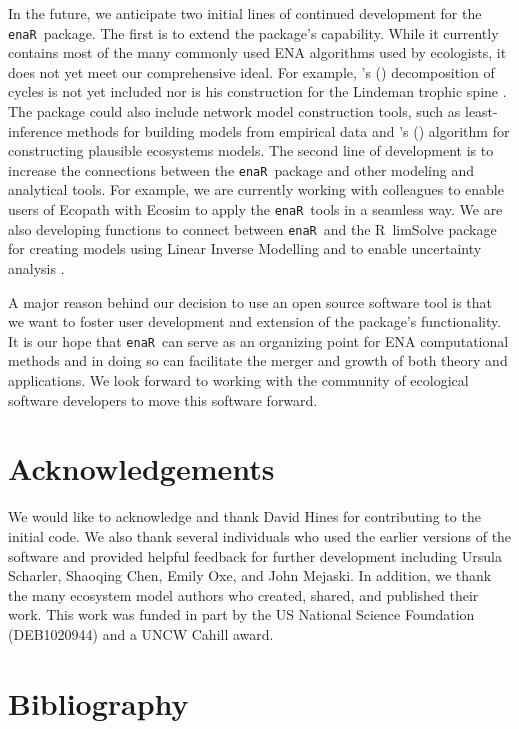 \documentclass[11pt]{article}
\def\citeapos#1{\citeauthor{#1}'s (\citeyear{#1})}
\newcommand{\R}{R}
\newcommand{\enaR}{\texttt{enaR}}
\begin{document}
\begin{spacing}{2}
In the future, we anticipate two initial lines of continued
development for the \enaR\ package. The first is to extend the
package's capability.  While it currently contains most of the many
commonly used ENA algorithms used by ecologists, it does not yet meet
our comprehensive ideal. For example, \citeapos{ulanowicz83}
decomposition of cycles is not yet included nor is his construction
for the Lindeman trophic spine \citep{ulanowicz1979trophic}.
%
The package could also include network model construction tools, such
as least-inference methods for building models from empirical data
\citep{ulanowicz2008least} and \citeapos{fath04_cyber} algorithm for
constructing plausible ecosystems models.
%
The second line of development is to increase the connections between
the \enaR\ package and other modeling and analytical tools.  For
example, we are currently working with colleagues to enable users of
Ecopath with Ecosim \citep{christensen04} to apply the \enaR\ tools in
a seamless way.  We are also developing functions to connect between
\enaR\ and the \R\ limSolve package \citep{soetaert09} for creating
models using Linear Inverse Modelling and to enable uncertainty
analysis \citep{kones09}.

A major reason behind our decision to use an open source software
tool is that we want to foster user development and extension
of the package's functionality. It is our hope that \enaR\ can serve
as an organizing point for ENA computational methods and in doing so
can facilitate the merger and growth of both theory and
applications. We look forward to working with the community of
ecological software developers to move this software forward.

\section{Acknowledgements}
We would like to acknowledge and thank David Hines for contributing to
the initial code.  We also thank several individuals who used the earlier
versions of the software and provided helpful feedback for further
development including Ursula Scharler, Shaoqing Chen, Emily Oxe, and
John Mejaski.  In addition, we thank the many ecosystem model authors who
created, shared, and published their work.   This work was funded in
part by the US National Science Foundation (DEB1020944) and a UNCW
Cahill award.  

\end{spacing}

\section{Bibliography}

\end{document}
